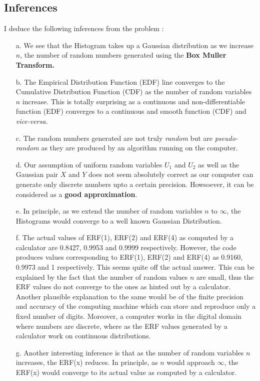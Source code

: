 \documentclass[titlepage, 11pt]{article}
\begin{document}
\subsection{Inferences}

I deduce the following inferences from the problem :
\begin{itemize}
    \item [a.] We see that the Histogram takes up a Gaussian distribution as we increase $n$, the number of random numbers generated using the \textbf{Box Muller Transform.}
    \item [b.] The Empirical Distribution Function (EDF) line converges to the Cumulative Distribution Function (CDF) as the number of random variables $n$ increase. This is totally surprising as a continuous and non-differentiable function (EDF) converges to a continuous and smooth function (CDF) and \emph{vice-versa.}
    \item [c.] The random numbers generated are not truly \emph{random} but are \emph{pseudo-random} as they are produced by an algorithm running on the computer. 
     \item [d.] Our assumption of uniform random variables $U_1$ and $U_2$ as well as the Gaussian pair $X$ and $Y$ does not seem absolutely correct as our computer can generate only discrete numbers upto a certain precision. Howsoever, it can be considered as a \textbf{good approximation}.
     \item [e.] In principle, as we extend the number of random variables $n$ to $\infty$, the Histograms would converge to a well known Gaussian Distribution. 
     \item [f.] The actual values of ERF(1), ERF(2) and ERF(4) as computed by a calculator are 0.8427, 0.9953 and 0.9999 respectively. However, the code produces values corresponding to ERF(1), ERF(2) and ERF(4) as 0.9160, 0.9973 and 1 respectively. This seems quite off the actual answer. This can be explained by the fact that the number of random values $n$ are small, thus the ERF values do not converge to the ones as hinted out by a calculator. Another plausible explanation to the same would be of the finite precision and accuracy of the computing machine which can store and reproduce only a fixed number of digits. Moreover, a computer works in the digital domain where numbers are discrete, where as the ERF values generated by a calculator work on continuous distributions. 
     \item [g.] Another interesting inference is that as the number of random variables $n$ increases, the ERF(x) reduces. In principle, as $n$ would approach $\infty$, the ERF(x) would converge to its actual value as computed by a calculator. 
\end{itemize}
\end{document}
